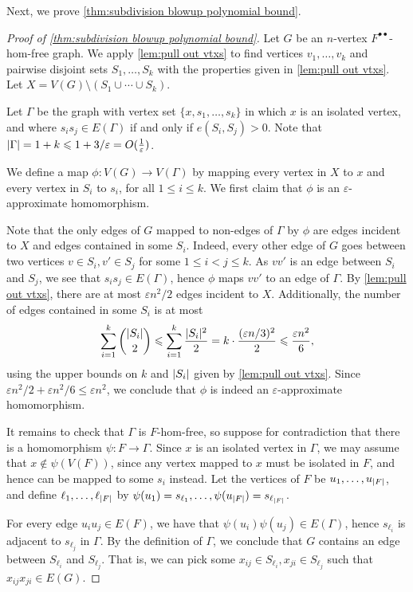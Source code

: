 \documentclass[reqno, english, 12pt]{amsart}
\theoremstyle{plain}
\theoremstyle{remark}
\DeclarePairedDelimiter{\abs}{\lvert}{\rvert}
\renewcommand{\leq}{\leqslant}
\newcommand{\e}{\ensuremath{\varepsilon}}
\begin{document}
\noindent
Next, we prove \cref{thm:subdivision blowup polynomial bound}.
\begin{proof}[Proof of \cref{thm:subdivision blowup polynomial bound}]
	Let $G$ be an $n$-vertex $F^{\bullet\bullet}$-hom-free graph. We apply \cref{lem:pull out vtxs} to find vertices $v_1,\dots,v_k$ and pairwise disjoint sets $S_1,\dots,S_k$ with the properties given in \cref{lem:pull out vtxs}. Let $X = V(G) \setminus (S_1 \cup \dotsb \cup S_k)$. 

	Let $\Gamma$ be the graph with vertex set $\{x,s_1,\dots,s_k\}$ in which $x$ is an isolated vertex, and where $s_is_j \in E(\Gamma)$ if and only if $e(S_i,S_j)>0$.
	Note that $\abs \Gamma = 1+k \leq 1 + 3/\varepsilon=O(\frac 1 \varepsilon)$.

	We define a map $\phi:V(G) \to V(\Gamma)$ by mapping every vertex in $X$ to $x$ and every vertex in $S_i$ to $s_i$, for all $1 \leq i \leq k$.
	We first claim that $\phi$ is an $\e$-approximate homomorphism.


	Note that the only edges of $G$ mapped to non-edges of $\Gamma$ by $\phi$ are edges incident to $X$ and edges contained in some $S_i$. Indeed,
	every other edge of $G$ goes between two vertices $v \in S_i, v' \in S_j$ for some $1 \leq i<j\leq k$. As $vv'$ is an edge between $S_i$ and $S_j$, we see that $s_is_j \in E(\Gamma)$, hence $\phi$ maps $vv'$ to an edge of $\Gamma$. By \cref{lem:pull out vtxs}, there are at most $\varepsilon n^2/2$ edges incident to $X$. Additionally, the number of edges contained in some $S_i$ is at most
	\[
		\sum_{i=1}^k \binom{\abs{S_i}}2 \leq \sum_{i=1}^k \frac{\abs{S_i}^2}{2} = k \cdot \frac{(\varepsilon n/3)^2}{2} \leq \frac{\varepsilon n^2}{6},
	\]
	using the upper bounds on $k$ and $\abs{S_i}$ given by \cref{lem:pull out vtxs}. Since $\varepsilon n^2/2 + \varepsilon n^2/6 \leq \varepsilon n^2$, we conclude that 
	$\phi$ is indeed an $\e$-approximate homomorphism.

	It remains to check that $\Gamma$ is $F$-hom-free, so suppose for contradiction that there is a homomorphism $\psi:F \to \Gamma$. Since $x$ is an isolated vertex in $\Gamma$, we may assume that $x \notin \psi(V(F))$, since any vertex mapped to $x$ must be isolated in $F$, and hence can be mapped to some $s_i$ instead. Let the vertices of $F$ be $u_1,\dots,u_{\abs F}$, and define $\ell_1,\dots,\ell_{\abs F}$ by $\psi(u_1) = s_{\ell_1},\dots,\psi(u_{\abs F})=s_{\ell_{\abs F}}$.

	For every edge $u_i u_j \in E(F)$, we have that $\psi(u_i) \psi(u_j) \in E(\Gamma)$, hence $s_{\ell_i}$ is adjacent to $s_{\ell_j}$ in $\Gamma$. By the definition of $\Gamma$, we conclude that $G$ contains an edge between $S_{\ell_i}$ and $S_{\ell_j}$. That is, we can pick some $x_{ij} \in S_{\ell_i}, x_{ji} \in S_{\ell_j}$ such that $x_{ij} x_{ji} \in E(G)$.


\end{proof}
\end{document}
